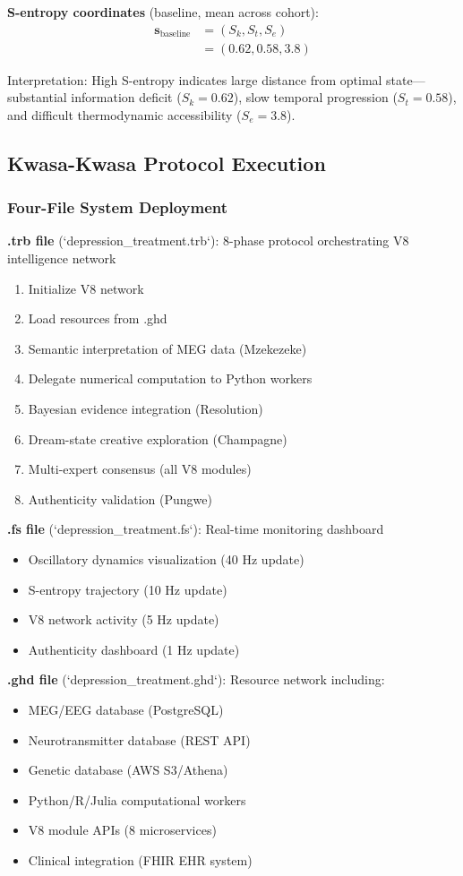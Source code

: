 \textbf{S-entropy coordinates} (baseline, mean across cohort):
\begin{align}
\mathbf{s}_{\text{baseline}} &= (S_k, S_t, S_e) \\
&= (0.62, 0.58, 3.8)
\end{align}

Interpretation: High S-entropy indicates large distance from optimal state—substantial information deficit ($S_k = 0.62$), slow temporal progression ($S_t = 0.58$), and difficult thermodynamic accessibility ($S_e = 3.8$).

\subsection{Kwasa-Kwasa Protocol Execution}

\subsubsection{Four-File System Deployment}

\textbf{.trb file} (`depression_treatment.trb`): 8-phase protocol orchestrating V8 intelligence network
\begin{enumerate}
\item Initialize V8 network
\item Load resources from .ghd
\item Semantic interpretation of MEG data (Mzekezeke)
\item Delegate numerical computation to Python workers
\item Bayesian evidence integration (Resolution)
\item Dream-state creative exploration (Champagne)
\item Multi-expert consensus (all V8 modules)
\item Authenticity validation (Pungwe)
\end{enumerate}

\textbf{.fs file} (`depression_treatment.fs`): Real-time monitoring dashboard
\begin{itemize}
\item Oscillatory dynamics visualization (40 Hz update)
\item S-entropy trajectory (10 Hz update)
\item V8 network activity (5 Hz update)
\item Authenticity dashboard (1 Hz update)
\end{itemize}

\textbf{.ghd file} (`depression_treatment.ghd`): Resource network including:
\begin{itemize}
\item MEG/EEG database (PostgreSQL)
\item Neurotransmitter database (REST API)
\item Genetic database (AWS S3/Athena)
\item Python/R/Julia computational workers
\item V8 module APIs (8 microservices)
\item Clinical integration (FHIR EHR system)
\end{itemize}

